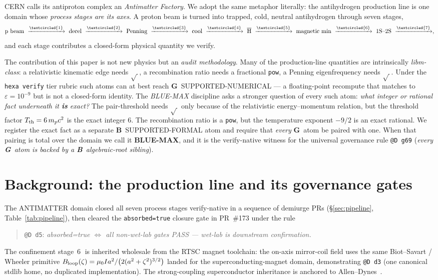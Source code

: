 \documentclass[11pt,a4paper]{article}
\newcommand{\tierBlue}{\textbf{B}}
\newcommand{\tierGreen}{\textbf{G}}
\newcommand{\stg}[1]{\textcircled{\scriptsize#1}}
\begin{document}
CERN calls its antiproton complex an \emph{Antimatter Factory}. We adopt the
same metaphor literally: the antihydrogen production line is one domain whose
\emph{process stages are its axes}. A proton beam is turned into trapped,
cold, neutral antihydrogen through seven stages,
\[
  \text{p beam}\ \xrightarrow{\stg{1}}\ \text{decel}\ \xrightarrow{\stg{2}}\
  \text{Penning}\ \xrightarrow{\stg{3}}\ \text{cool}\ \xrightarrow{\stg{4}}\
  \overline{\text{H}}\ \xrightarrow{\stg{5}}\ \text{magnetic min}\
  \xrightarrow{\stg{6}}\ \text{1S--2S}\ \xrightarrow{\stg{7}},
\]
and each stage contributes a closed-form physical quantity we verify.

The contribution of this paper is not new physics but an \emph{audit
methodology}. Many of the production-line quantities are intrinsically
\emph{libm-class}: a relativistic kinematic edge needs $\sqrt{\,}$, a
recombination ratio needs a fractional \texttt{pow}, a Penning
eigenfrequency needs $\sqrt{\,}$. Under the \texttt{hexa verify} tier rubric
such atoms can at best reach \tierGreen\ SUPPORTED-NUMERICAL --- a
floating-point recompute that matches to $\varepsilon=10^{-9}$ but is not a
closed-form identity. The \emph{BLUE-MAX} discipline asks a stronger
question of every such atom: \emph{what integer or rational fact underneath
it \textbf{is} exact?} The pair-threshold needs $\sqrt{\,}$ only because of
the relativistic energy--momentum relation, but the threshold factor
$T_{\rm th}=6\,m_pc^2$ is the exact integer $6$. The recombination ratio is a
\texttt{pow}, but the temperature exponent $-9/2$ is an exact rational. We
register the exact fact as a separate \tierBlue\ SUPPORTED-FORMAL atom and
require that \emph{every} \tierGreen\ atom be paired with one. When that
pairing is total over the domain we call it \textbf{BLUE-MAX}, and it is the
verify-native witness for the universal governance rule
\texttt{@D~g69} (\emph{every \tierGreen\ atom is backed by a \tierBlue\
algebraic-root sibling}).

\section{Background: the production line and its governance gates}
\label{sec:bg}

The ANTIMATTER domain closed all seven process stages verify-native in a
sequence of demiurge PRs (\S\ref{sec:pipeline}, Table~\ref{tab:pipeline}),
then cleared the \texttt{absorbed=true} closure gate in PR~\#173 under the
rule
\begin{quote}\small
  \texttt{@D~d5}: \emph{absorbed=true $\Leftrightarrow$ all non-wet-lab gates
  PASS --- wet-lab is downstream confirmation.}
\end{quote}
The confinement stage~\stg{6} is inherited wholesale from the RTSC magnet
toolchain: the on-axis mirror-coil field uses the same Biot--Savart /
Wheeler primitive
$B_{\rm loop}(\zeta)=\mu_0 I a^2/\!\left(2(a^2+\zeta^2)^{3/2}\right)$
landed for the superconducting-magnet domain, demonstrating
\texttt{@D~d3} (one canonical stdlib home, no duplicated implementation).
The strong-coupling superconductor inheritance is anchored to
Allen--Dynes~\citep{Allen1975}.
\end{document}
